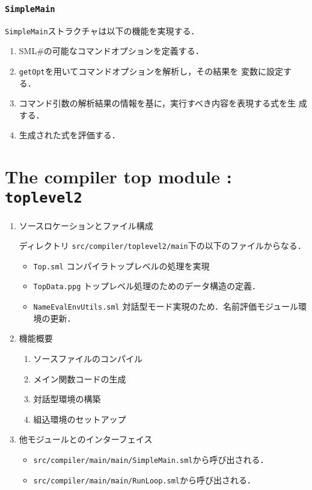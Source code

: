 \documentclass{jbook}
\newcommand{\txt}[2]{#2}
\newcommand{\smlsharp}{SML\#}
\newcommand{\code}[1]{\mbox{\large\tt #1}}
\begin{document}
\subsection{\code{SimpleMain}}
	\code{SimpleMain}ストラクチャは以下の機能を実現する．
\begin{enumerate}
\item \smlsharp{}の可能なコマンドオプションを定義する．
\item \code{getOpt}を用いてコマンドオプションを解析し，その結果を
変数に設定する．
\item コマンド引数の解析結果の情報を基に，実行すべき内容を表現する式を生
成する．
\item 生成された式を評価する．
\end{enumerate}

\fi%


% 
\chapter{\txt
{コンパイラトップモジュール：\code{toplevel2}}
{The compiler top module : \code{toplevel2}}
}
\label{chap:TopLevel}

\ifjp%
\begin{enumerate}
\item ソースロケーションとファイル構成

ディレクトリ \code{src/compiler/toplevel2/main}下の以下のファイルからなる．
\begin{itemize}
\item \code{Top.sml} コンパイラトップレベルの処理を実現
\item \code{TopData.ppg} トップレベル処理のためのデータ構造の定義．
\item \code{NameEvalEnvUtils.sml} 対話型モード実現のため．名前評価モジュール環境の更新．
\end{itemize}

\item 機能概要 
\begin{enumerate}
\item ソースファイルのコンパイル
\item メイン関数コードの生成
\item 対話型環境の構築
\item 組込環境のセットアップ
\end{enumerate}
\item 他モジュールとのインターフェイス
\begin{itemize}
\item \code{src/compiler/main/main/SimpleMain.sml}から呼び出される．
\item \code{src/compiler/main/main/RunLoop.sml}から呼び出される．
\end{itemize}
\end{enumerate}
\else%
\fi%
\end{document}
